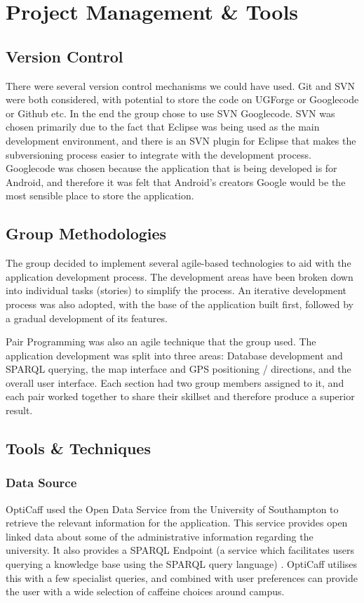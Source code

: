 \section{Project Management \& Tools}

\subsection{Version Control}
\label{sec:VersionControl}

There were several version control mechanisms we could have used. Git and SVN were both considered, with potential to store the code on UGForge or Googlecode or Github etc. In the end the group chose to use SVN Googlecode. SVN was chosen primarily due to the fact that Eclipse was being used as the main development environment, and there is an SVN plugin for Eclipse that makes the subversioning process easier to integrate with the development process. Googlecode was chosen because the application that is being developed is for Android, and therefore it was felt that Android’s creators Google would be the most sensible place to store the application. 

\subsection{Group Methodologies}
The group decided to implement several agile-based technologies to aid with the application development process. The development areas have been broken down into individual tasks (stories) to simplify the process. An iterative development process was also adopted, with the base of the application built first, followed by a gradual development of its features. 

Pair Programming was also an agile technique that the group used. The application development was split into three areas: Database development and SPARQL querying, the map interface and GPS positioning / directions, and the overall user interface. Each section had two group members assigned to it, and each pair worked together to share their skillset and therefore produce a superior result. 

\subsection{Tools \& Techniques}

\subsubsection{Data Source}
OptiCaff used the Open Data Service from the University of Southampton \cite{DataSouthampton} to retrieve the relevant information for the application. This service provides open linked data about some of the administrative information regarding the university. It also provides a SPARQL Endpoint \cite{SotonSparql} (a service which facilitates users querying a knowledge base using the SPARQL query language) \cite{SparqlEndpoint}. OptiCaff utilises this with a few specialist queries, and combined with user preferences can provide the user with a wide selection of caffeine choices around campus. 

